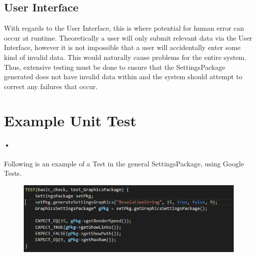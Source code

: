 \documentclass[11pt]{article}
\begin{document}
\subsection{User Interface}
With regards to the User Interface, this is where potential for human error can occur at runtime. Theoretically a user will only submit relevant data via the User Interface, however it is not impossible that a user will accidentally enter some kind of invalid data. This would naturally cause problems for the entire system.
\newline Thus, extensive testing must be done to ensure that the SettingsPackage generated does not have invalid data within and the system should attempt to correct any failures that occur.


\section{Example Unit Test}
\paragraph{•}
Following is an example of a Test in the general SettingsPackage, using Google Tests.
\begin{figure}[h]
\includegraphics[scale=0.7]{GTest.png}
\end{figure}
\end{document}
